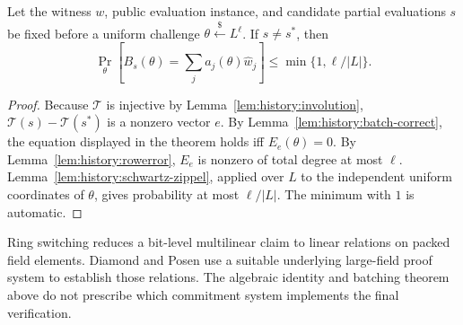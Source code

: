\begin{theorem}\label{thm:history:ring-sound}
Let the witness $w$, public evaluation instance, and candidate partial evaluations $s$ be fixed before a uniform challenge $\theta\overset{\$}{\leftarrow}L^\ell$. If $s\ne s^*$, then
\[
 \Pr_\theta\left[B_s(\theta)=\sum_ja_j(\theta)\widehat w_j\right]
 \leq\min\{1,\ell/|L|\}.
\]
\end{theorem}
\begin{proof}
Because $\mathcal T$ is injective by Lemma~\ref{lem:history:involution}, $\mathcal T(s)-\mathcal T(s^*)$ is a nonzero vector $e$. By Lemma~\ref{lem:history:batch-correct}, the equation displayed in the theorem holds iff
$E_e(\theta)=0$. By Lemma~\ref{lem:history:rowerror}, $E_e$ is nonzero of total degree at most $\ell$. Lemma~\ref{lem:history:schwartz-zippel}, applied over $L$ to the independent uniform coordinates of $\theta$, gives probability at most $\ell/|L|$. The minimum with $1$ is automatic.
\end{proof}

\begin{remark}
Ring switching reduces a bit-level multilinear claim to linear relations on packed field elements. Diamond and Posen use a suitable underlying large-field proof system to establish those relations. The algebraic identity and batching theorem above do not prescribe which commitment system implements the final verification.
\end{remark}
